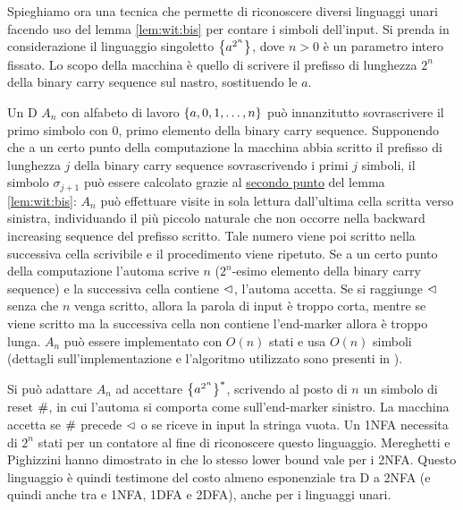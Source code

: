Spieghiamo ora una tecnica che permette di riconoscere diversi linguaggi unari facendo uso del lemma \ref{lem:wit:bis} per contare i simboli dell'input. Si prenda in considerazione il linguaggio singoletto $\left\{ a^{2^n} \right\}$, dove $n>0$ è un parametro intero fissato. Lo scopo della macchina è quello di scrivere il prefisso di lunghezza $2^n$ della binary carry sequence sul nastro, sostituendo le $a$.

Un D $A_n$ con alfabeto di lavoro $\left\{ a,0,1,\dots,n \right\}$ può innanzitutto sovrascrivere il primo simbolo con $0$, primo elemento della binary carry sequence. Supponendo che a un certo punto della computazione la macchina abbia scritto il prefisso di lunghezza $j$ della binary carry sequence sovrascrivendo i primi $j$ simboli, il simbolo $\sigma_{j+1}$ può essere calcolato grazie al \hyperref[lem:wit:bis:2]{secondo punto} del lemma \ref{lem:wit:bis}: $A_n$ può effettuare visite in sola lettura dall'ultima cella scritta verso sinistra, individuando il più piccolo naturale che non occorre nella backward increasing sequence del prefisso scritto. Tale numero viene poi scritto nella successiva cella scrivibile e il procedimento viene ripetuto. Se a un certo punto della computazione l'automa scrive $n$ ($2^n$-esimo elemento della binary carry sequence) e la successiva cella contiene $\lhd$, l'automa accetta. Se si raggiunge $\lhd$ senza che $n$ venga scritto, allora la parola di input è troppo corta, mentre se viene scritto ma la successiva cella non contiene l'end-marker allora è troppo lunga. $A_n$ può essere implementato con $O(n)$ stati e usa $O(n)$ simboli (dettagli sull'implementazione e l'algoritmo utilizzato sono presenti in \cite{Pighizzini:19:limitedunary}).

Si può adattare $A_n$ ad accettare $\left\{ a^{2^n} \right\}^*$, scrivendo al posto di $n$ un simbolo di reset $\#$, in cui l'automa si comporta come sull'end-marker sinistro. La macchina accetta se $\#$ precede $\lhd$ o se riceve in input la stringa vuota. Un 1NFA necessita di $2^n$ stati per un contatore al fine di riconoscere questo linguaggio. Mereghetti e Pighizzini hanno dimostrato in \cite{Mereghetti:00:twoway} che lo stesso lower bound vale per i 2NFA. Questo linguaggio è quindi testimone del costo almeno esponenziale tra D a 2NFA (e quindi anche tra  e 1NFA, 1DFA e 2DFA), anche per i linguaggi unari.

